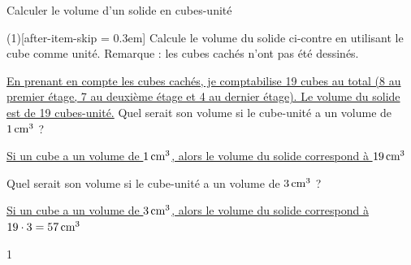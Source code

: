\documentclass[a4paper,11pt]{report}
\begin{document}
\begin{resolu}{Calculer le volume d'un solide en cubes-unité}{
\begin{minipage}[t]{0.6\textwidth}{
\vspace{0pt}
\begin{tasks}(1)[after-item-skip = 0.3em]
    \task Calcule le volume du solide ci-contre en utilisant le cube comme unité. Remarque : les cubes cachés n'ont pas été dessinés. 
\end{tasks}
}
\end{minipage}
\begin{minipage}[t]{0.4\textwidth}{
\vspace{0pt}
\begin{center}
\end{center}
}
\end{minipage}

\begin{tasks}[after-item-skip = 0.3em] 
	\task[]     \uline{En prenant en compte les cubes cachés, je comptabilise 19 cubes au total (8 au premier étage, 7 au deuxième étage et 4 au dernier étage). Le volume du solide est de 19 cubes-unité.}
	\task[b)] Quel serait son volume si le cube-unité a un volume de $\tunit{1}{\centi m^3}$ ? 

    \uline{Si un cube a un volume de $\tunit{1}{\centi m^3}$, alors le volume du solide correspond à $\tunit{19}{\centi m^3}$}
    
    \task[c)] Quel serait son volume si le cube-unité a un volume de $\tunit{3}{\centi m^3}$ ? 
    
    \uline{Si un cube a un volume de $\tunit{3}{\centi m^3}$, alors le volume du solide correspond à $19\cdot3=\tunit{57}{\centi m^3}$}
\end{tasks}
}{1}    
\end{resolu}
\end{document}
